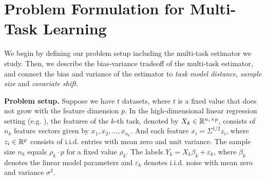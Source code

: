 \section{Problem Formulation for Multi-Task Learning}
\label{sec_prelim}

We begin by defining our problem setup including the multi-task estimator we study.
Then, we describe the bias-variance tradeoff of the multi-task estimator, and connect the bias and variance of the estimator to \textit{task model distance}, \textit{sample size} and \textit{covariate shift}.

\textbf{Problem setup.}
Suppose we have $t$ datasets, where $t$ is a fixed value that does not grow with the feature dimension $p$.
In the high-dimensional linear regression setting (e.g. \cite{HMRT19,BLLT20}), the features of the $k$-th task, denoted by $X_k\in\mathbb{R}^{n_i\times p}$, consists of $n_k$ feature vectors given by $x_1, x_2, \dots, x_{n_k}$.
And each feature $x_i = \Sigma^{1/2}z_i$, where $z_i\in\mathbb{R}^p$ consists of i.i.d. entries with mean zero and unit variance.
The sample size $n_k $ equals $\rho_k\cdot p$ for a fixed value $\rho_k$.
The labels $Y_k = X_k \beta_k + \varepsilon_k$, where $\beta_k$ denotes the linear model parameters and $\varepsilon_k$ denotes i.i.d. noise with mean zero and variance $\sigma^2$.

